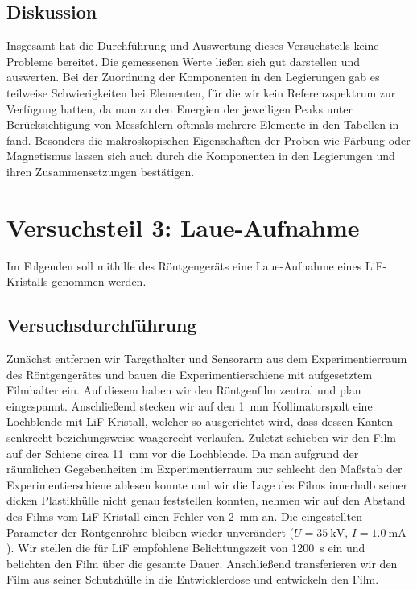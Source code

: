 \documentclass[11pt, a4paper]{article}
\begin{document}
\subsection{Diskussion}

Insgesamt hat die Durchführung und Auswertung dieses Versuchsteils keine Probleme bereitet.
Die gemessenen Werte ließen sich gut darstellen und auswerten.
Bei der Zuordnung der Komponenten in den Legierungen gab es teilweise Schwierigkeiten bei Elementen, für die wir kein Referenzspektrum zur Verfügung hatten, da man zu den Energien der jeweiligen Peaks unter Berücksichtigung von Messfehlern oftmals mehrere Elemente in den Tabellen in \cite{booklet} fand.
Besonders die makroskopischen Eigenschaften der Proben wie Färbung oder Magnetismus lassen sich auch durch die Komponenten in den Legierungen und ihren Zusammensetzungen bestätigen.

\section{Versuchsteil 3: Laue-Aufnahme}
Im Folgenden soll mithilfe des Röntgengeräts eine Laue-Aufnahme eines LiF-Kristalls genommen werden.

\subsection{Versuchsdurchführung}
Zunächst entfernen wir Targethalter und Sensorarm aus dem Experimentierraum des Röntgengerätes und bauen die Experimentierschiene mit aufgesetztem Filmhalter ein.
Auf diesem haben wir den Röntgenfilm zentral und plan eingespannt.
Anschließend stecken wir auf den \SI{1}{\milli\metre} Kollimatorspalt eine Lochblende mit LiF-Kristall, welcher so ausgerichtet wird, dass dessen Kanten senkrecht beziehungsweise waagerecht verlaufen.
Zuletzt schieben wir den Film auf der Schiene circa \SI{11}{\milli\metre} vor die Lochblende.
Da man aufgrund der räumlichen Gegebenheiten im Experimentierraum nur schlecht den Maßstab der Experimentierschiene ablesen konnte und wir die Lage des Films innerhalb seiner dicken Plastikhülle nicht genau feststellen konnten, nehmen wir auf den Abstand des Films vom LiF-Kristall einen Fehler von \SI{2}{\milli\metre} an.
Die eingestellten Parameter der Röntgenröhre bleiben wieder unverändert ($U = \SI{35}{\kilo\volt}$, $I = \SI{1,0}{\milli\ampere}$).
Wir stellen die für LiF empfohlene Belichtungszeit von \SI{1200}{\second} ein und belichten den Film über die gesamte Dauer.
Anschließend transferieren wir den Film aus seiner Schutzhülle in die Entwicklerdose und entwickeln den Film.
\end{document}
